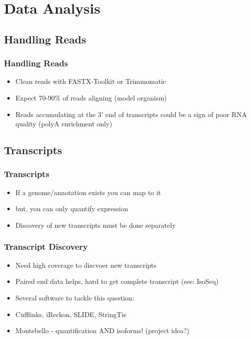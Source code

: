 \documentclass[14pt]{beamer}
\begin{document}
\section{Data Analysis}

\subsection{Handling Reads}

\begin{frame}
\frametitle{Handling Reads}
\begin{itemize}
	\item<1-> Clean reads with FASTX-Toolkit or Trimmomatic
	\item<2-> Expect 70-90\% of reads aligning (model organism)
	\item<3-> Reads accumulating at the 3' end of transcripts could be a sign of poor RNA quality (polyA enrichment only)
\end{itemize}
\end{frame}

\subsection{Transcripts}
\begin{frame}
\frametitle{Transcripts}
\begin{itemize}
	\item<1-> If a genome/annotation exists you can map to it
	\item<2-> but, you can only quantify expression
	\item<3-> Discovery of new transcripts must be done separately
\end{itemize}
\end{frame}

\begin{frame}
\frametitle{Transcript Discovery}
\begin{itemize}
	\item<1-> Need high coverage to discvoer new transcripts
	\item<2-> Paired end data helps, hard to get complete transcript (see: IsoSeq)
	\item<3-> Several software to tackle this question:
	\item<4-> Cufflinks, iReckon, SLIDE, StringTie
	\item<5-> Montebello - quantification AND isoforms! (project idea?)
\end{itemize}
\end{frame}
\end{document}
